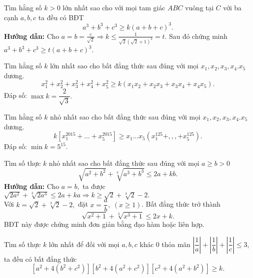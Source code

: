 {\begin{bt}%
	Tìm hằng số $k>0$ lớn nhất sao cho với mọi tam giác $ABC$ vuông tại $C$ với ba cạnh $a,b,c$ ta đều có BĐT $$a^3+b^3+c^3\ge k(a+b+c)^3.$$
	\textbf{Hướng dẫn:} 	Cho $a=b=\frac{c}{\sqrt{2}}\Rightarrow k\leq \frac{1}{\sqrt{2}\left ( \sqrt{2}+1 \right )^{2}}=t.$	Sau đó chứng minh $a^{3}+b^{3}+c^{3}\geq t\left ( a+b+c \right )^{3}.$	
	\end{bt}
\begin{bt}%
	Tìm hằng số $k$ lớn nhất sao cho bất đẳng thức sau đúng với mọi $x_1,x_2,x_3,x_4.x_5$ dương.
	$$x_{1}^{2}+x_{2}^{2}+x_{3}^{2}+x_{4}^{2}+x_{5}^{2}\geq k\left ( x_1x_2+  x_2x_3+ x_3x_4+ x_4x_5\right ). $$
	Đáp số: $\max k= \dfrac{2}{\sqrt{3}}.$
\end{bt}
\begin{bt}%
	Tìm hằng số $k$ nhỏ nhất sao cho bất đẳng thức sau đúng với mọi $x_1,x_2,x_3,x_4.x_5$ dương.
$$k\left [ x_{1}^{2015} +...+x_{5}^{2015}\right ]\geq x_1...x_5\left ( x_{1}^{125}+,,,+x_{5}^{125} \right ). $$
	Đáp số: $\min k= 5^{15}.$
\end{bt}
\begin{bt}%
	Tìm số thực $k$ nhỏ nhất sao cho bất đẳng thức sau đúng với mọi $a\ge b>0$ 
$$\sqrt{a^2+b^2}+\sqrt[3]{a^3+b^3}\leq 2a+kb. $$
	\textbf{Hướng dẫn:} Cho $a=b,$ ta được $\sqrt{2a^2}+\sqrt[3]{2a^3}\leq 2a+ka\Rightarrow k\geq \sqrt{2}+\sqrt[3]{2}-2.$\\
	Với $ k=\sqrt{2}+\sqrt[3]{2}-2,$ đặt $x=\dfrac{a}{b},\; (x\ge 1) $. Bất đẳng thức trở thành 
	$$\sqrt{x^2+1}+\sqrt[3]{x^3+1}\leq 2x+k. $$
	BĐT này được chứng minh đơn giản bằng đạo hàm hoặc liên hợp.
\end{bt}
\begin{vd} [BMO 2012]%
Tìm số thực $k$ lớn nhất để đối với mọi $a,b,c$ khác $0$ thỏa mãn $ \left | \dfrac{1}{a} \right |+\left | \dfrac{1}{b} \right |+\left | \dfrac{1}{c} \right |\leq 3$, ta đều có bất đẳng thức 
\begin{equation}
\left [ a^2+4\left ( b^2+c^2 \right ) \right ]\left [ b^2+4\left (a^{2} +c^2 \right ) \right ]\left [ c^2+4\left ( a^{2} +b^{2}\right ) \right ] \ge k.
\end{equation}


\end{vd}}
